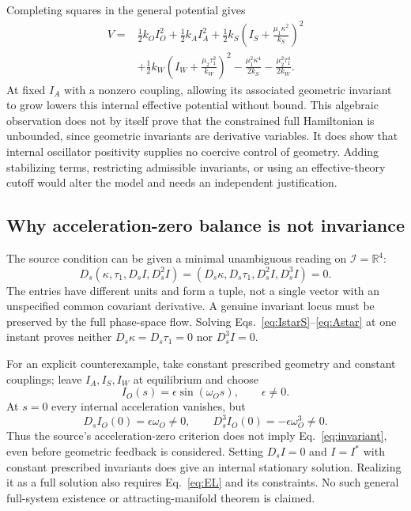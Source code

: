 \documentclass[aip,jmp,reprint,onecolumn,amsmath,amssymb]{revtex4-2}
\newcommand{\Ds}{D_s}
\newcommand{\I}{\mathcal I}
\begin{document}
Completing squares in the general potential gives
\begin{align}
 V={}&\tfrac12 k_O I_O^2+\tfrac12 k_A I_A^2
 +\tfrac12 k_S\left(I_S+\frac{\mu_1\kappa^2}{k_S}\right)^2\nonumber\\
 &+\tfrac12 k_W\left(I_W+\frac{\mu_2\tau_1^2}{k_W}\right)^2
 -\frac{\mu_1^2\kappa^4}{2k_S}
 -\frac{\mu_2^2\tau_1^4}{2k_W}.
 \label{eq:negative}
\end{align}
At fixed $I_A$ with a nonzero coupling, allowing its associated geometric invariant to grow lowers this internal effective potential without bound. This algebraic observation does not by itself prove that the constrained full Hamiltonian is unbounded, since geometric invariants are derivative variables. It does show that internal oscillator positivity supplies no coercive control of geometry. Adding stabilizing terms, restricting admissible invariants, or using an effective-theory cutoff would alter the model and needs an independent justification.

\subsection{Why acceleration-zero balance is not invariance}
The source condition can be given a minimal unambiguous reading on $\I=\mathbb R^4$:
\begin{equation}
 \Ds(\kappa,\tau_1,\Ds I,\Ds^2I)
 =(\Ds\kappa,\Ds\tau_1,\Ds^2I,\Ds^3I)=0.
 \label{eq:invariant}
\end{equation}
The entries have different units and form a tuple, not a single vector with an unspecified common covariant derivative. A genuine invariant locus must be preserved by the full phase-space flow. Solving Eqs.~\eqref{eq:IstarS}--\eqref{eq:Astar} at one instant proves neither $\Ds\kappa=\Ds\tau_1=0$ nor $\Ds^3I=0$.

For an explicit counterexample, take constant prescribed geometry and constant couplings; leave $I_A,I_S,I_W$ at equilibrium and choose
\begin{equation}
 I_O(s)=\epsilon\sin(\omega_Os),\qquad \epsilon\ne0.
\end{equation}
At $s=0$ every internal acceleration vanishes, but
\begin{equation}
 \Ds I_O(0)=\epsilon\omega_O\ne0,\qquad
 \Ds^3I_O(0)=-\epsilon\omega_O^3\ne0.
\end{equation}
Thus the source's acceleration-zero criterion does not imply Eq.~\eqref{eq:invariant}, even before geometric feedback is considered. Setting $\Ds I=0$ and $I=I^*$ with constant prescribed invariants does give an internal stationary solution. Realizing it as a full solution also requires Eq.~\eqref{eq:EL} and its constraints. No such general full-system existence or attracting-manifold theorem is claimed.
\end{document}
